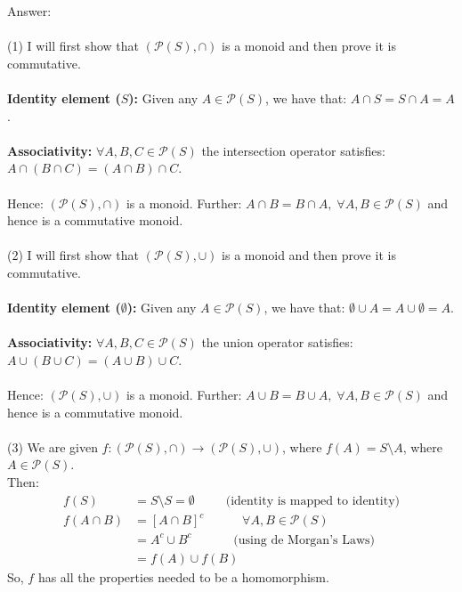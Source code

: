 \documentclass[12pt,a4paper]{article}
\begin{document}
\vspace{1cm}
\noindent 
Answer: \\
\\
(1) I will first show that $(\mathcal{P}(S), \cap)$ is a monoid and then prove it is commutative.\\
\\
\textbf{Identity element ($S$):} Given any $A \in \mathcal{P}(S)$, we have that: $A \cap S = S \cap A = A$.\\
\\
\textbf{Associativity:}  $\forall A,B,C \in \mathcal{P}(S)$ the intersection operator satisfies: $A \cap (B \cap C) = (A \cap B) \cap C$.\\
\\
Hence: $(\mathcal{P}(S), \cap)$ is a monoid.  Further: $A \cap B = B \cap A, \; \forall A,B \in \mathcal{P}(S)$ and hence is a commutative monoid.\\
\\
(2) I will first show that $(\mathcal{P}(S), \cup)$ is a monoid and then prove it is commutative.\\
\\
\textbf{Identity element ($\emptyset$):} Given any $A \in \mathcal{P}(S)$, we have that: $\emptyset \cup A = A \cup \emptyset = A$.\\
\\
\textbf{Associativity:}  $\forall A,B,C \in \mathcal{P}(S)$ the union operator satisfies: $A \cup (B \cup C) = (A \cup B) \cup C$.\\
\\
Hence: $(\mathcal{P}(S), \cup)$ is a monoid.  Further: $A \cup B = B \cup A, \; \forall A,B \in \mathcal{P}(S)$ and hence is a commutative monoid.\\
\\
(3) We are given $f:(\mathcal{P}(S), \cap) \to (\mathcal{P}(S), \cup)$, where $f(A) = S \setminus A$, where $A \in \mathcal{P}(S)$.\\
Then:
\begin{align*}
  f(S) &= S \setminus S = \emptyset \;\;\;\;\;\;\;\;\; \text{(identity is mapped to identity)} \\
  f(A \cap B) &= [A \cap B]^c  \;\;\;\;\;\;\;\;\;\;\; \forall A,B \in \mathcal{P}(S) \\
  &= A^c \cup B^c \;\;\;\;\;\;\;\;\;\;\;\; \text{(using de Morgan's Laws)}\\
  & = f(A) \cup f(B)
\end{align*}
So, $f$ has all the properties needed to be a homomorphism.
\end{document}
